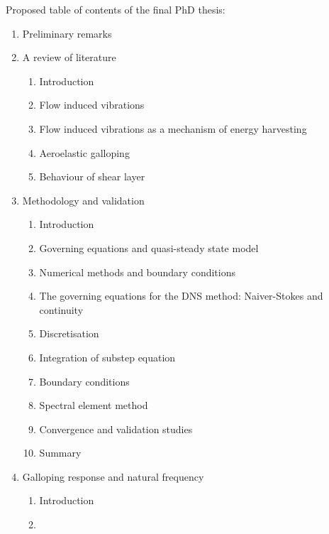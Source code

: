 \documentclass{article}
\begin{document}
%
%
Proposed table of contents of the final PhD thesis:
\begin{enumerate}
\item Preliminary remarks 
\item A review of literature
\begin{enumerate}[i]
\item Introduction
\item Flow induced vibrations 
\item Flow induced vibrations as a mechanism of energy harvesting
\item Aeroelastic galloping
\item Behaviour of shear layer 
\end{enumerate}
\item Methodology and validation
\begin{enumerate}[i]
\item Introduction
\item Governing equations and quasi-steady state model 
\item Numerical methods and boundary conditions 
\item The governing equations for the DNS method: Naiver-Stokes and continuity  
\item Discretisation  
\item Integration of substep equation 
\item Boundary conditions 
\item Spectral element method
\item Convergence and validation studies 
\item Summary
\end{enumerate}
\item Galloping response and natural frequency
\begin{enumerate}[i]
\item Introduction
\item 


\end{enumerate}
\end{enumerate}
\end{document}
